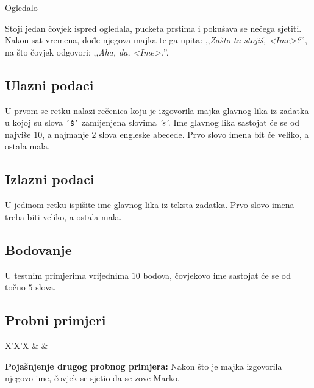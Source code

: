 \begin{statement}[
  problempoints=20,
  timelimit=1 sekunda,
  memorylimit=512 MiB,
]{Ogledalo}


Stoji jedan čovjek ispred ogledala, pucketa prstima i pokušava se nečega
sjetiti. Nakon sat vremena, dođe njegova majka te ga upita: ,,\textit{Zašto
tu stojiš, <Ime>?}'', na što čovjek odgovori: ,,\textit{Aha, da, <Ime>.}''.

\subsection*{Ulazni podaci}
U prvom se retku nalazi rečenica koju je izgovorila majka glavnog lika iz
zadatka u kojoj su slova \texttt{'š'} zamijenjena slovima \textit{'s'}. Ime
glavnog lika sastojat će se od najviše $10$, a najmanje $2$ slova engleske
abecede. Prvo slovo imena bit će veliko, a ostala mala.

\subsection*{Izlazni podaci}
U jedinom retku ispišite ime glavnog lika iz teksta zadatka. Prvo slovo imena
treba biti veliko, a ostala mala.

\subsection*{Bodovanje}
U testnim primjerima vrijednima $10$ bodova, čovjekovo ime sastojat će se od
točno $5$ slova.\\

\subsection*{Probni primjeri}
\begin{tabularx}{\textwidth}{X'X'X}
 &
 &
\end{tabularx}

\textbf{Pojašnjenje drugog probnog primjera:}
Nakon što je majka izgovorila njegovo ime, čovjek se sjetio da se zove Marko.

\end{statement}

